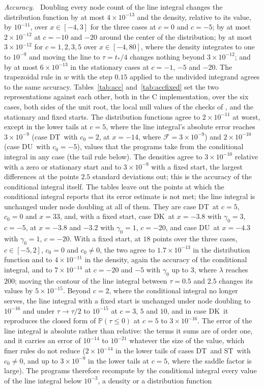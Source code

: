 \documentclass[ecta,nameyear,final,supplement]{econsocart}
\newcommand{\PP}{{\mathbb P}}
\newcommand{\Fk}{\textsf{\upshape DK}}
\newcommand{\Fu}{\textsf{\upshape DU}}
\newcommand{\Ft}{\textsf{\upshape DT}}
\newcommand{\St}{\textsf{\upshape ST}}
\newcommand{\cF}{\mathcal{F}}
\theoremstyle{plain}
\theoremstyle{definition}
\newcommand{\runin}[1]{\par\medskip\noindent\textit{#1.}\ \ignorespaces}
\begin{document}
\runin{Accuracy}  Doubling every node count of the line integral changes the distribution function by at most $4\times10^{-13}$ and the density, relative to its value, by $10^{-11}$, over $x\in[-4,3]$ for the three cases at $c=0$ and $c=-5$; by at most $2\times10^{-12}$ at $c=-10$ and $-20$ around the center of the distribution; by at most $3\times10^{-12}$ for $c=1,2,3,5$ over $x\in[-4,80]$, where the density integrates to one to $10^{-9}$ and moving the line to $\tau=t_*/4$ changes nothing beyond $3\times10^{-12}$; and by at most $6\times10^{-13}$ in the stationary cases at $c=-1$, $-5$ and $-20$.  The trapezoidal rule in $w$ with the step $0.15$ applied to the undivided integrand agrees to the same accuracy.  Tables~\ref{tab:acc} and~\ref{tab:accfixed} set the two representations against each other, both in the C implementation, over the six cases, both sides of the unit root, the local null values of the checks of \cite{BaoBrodaKan2026}, and the stationary and fixed starts.  The distribution functions agree to $2\times10^{-11}$ at worst, except in the lower tails at $c=5$, where the line integral's absolute error reaches $3\times10^{-9}$ (case \Ft\ with $c_0=2$, at $x=-14$, where $\cF=3\times10^{-9}$) and $2\times10^{-10}$ (case \Fu\ with $c_0=-5$), values that the programs take from the conditional integral in any case (the tail rule below).  The densities agree to $3\times10^{-10}$ relative with a zero or stationary start and to $3\times10^{-9}$ with a fixed start, the largest differences at the points $2.5$ standard deviations out; this is the accuracy of the conditional integral itself.  The tables leave out the points at which the conditional integral reports that its error estimate is not met; the line integral is unchanged under node doubling at all of them.  They are case \Ft\ at $c=5$, $c_0=0$ and $x=33$, and, with a fixed start, case \Fk\ at $x=-3.8$ with $\gamma_0=3$, $c=-5$, at $x=-3.8$ and $-3.2$ with $\gamma_0=1$, $c=-20$, and case \Fu\ at $x=-4.3$ with $\gamma_0=1$, $c=-20$.  With a fixed start, at $18$ points over the three cases, $c\in[-5,2]$, $c_0=0$ and $c_0\ne0$, the two agree to $1.7\times10^{-13}$ in the distribution function and to $4\times10^{-11}$ in the density, again the accuracy of the conditional integral, and to $7\times10^{-14}$ at $c=-20$ and $-5$ with $\gamma_0$ up to $3$, where $\lambda$ reaches $200$; moving the contour of the line integral between $\tau=0.5$ and $2.5$ changes its values by $5\times10^{-15}$.  Beyond $c=2$, where the conditional integral no longer serves, the line integral with a fixed start is unchanged under node doubling to $10^{-16}$ and under $\tau\to\tau/2$ to $10^{-15}$ at $c=3$, $5$ and $10$, and in case \Fk\ it reproduces the closed form of $\PP(\tau\le0)$ at $c=5$ to $3\times10^{-16}$.  The error of the line integral is absolute rather than relative: the terms it sums are of order one, and it carries an error of $10^{-14}$ to $10^{-21}$ whatever the size of the value, which finer rules do not reduce ($2\times10^{-14}$ in the lower tails of cases \Ft\ and \St\ with $c_0\ne0$, and up to $3\times10^{-9}$ in the lower tails at $c=5$, where the saddle factor is large).  The programs therefore recompute by the conditional integral every value of the line integral below $10^{-3}$, a density or a distribution function 
\end{document}
